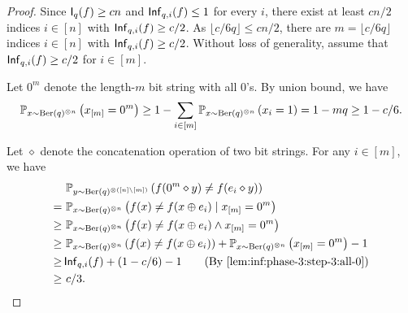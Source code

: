 \begin{proof}
    Since $\operatorname{\mathsf{I}}_q(f) \ge cn$ and $\operatorname{\mathsf{Inf}}_{q,i}(f) \le 1$ for every $i$, there exist at least $cn/2$ indices $i\in [n]$ with $\operatorname{\mathsf{Inf}}_{q,i}(f) \ge c / 2$. As $\lfloor c / 6q\rfloor \le cn/2$, there are $m = \lfloor c / 6q\rfloor$ indices $i\in [n]$ with $\operatorname{\mathsf{Inf}}_{q,i}(f) \ge c / 2$. Without loss of generality, assume that $\operatorname{\mathsf{Inf}}_{q,i}(f) \ge c / 2$ for $i\in [m]$.

    Let $0^m$ denote the length-$m$ bit string with all $0$'s. By union bound, we have
    \begin{align}
    \label{lem:inf:phase-3:step-3:all-0}
    \begin{split}
    \mathbb{P}_{x \sim \operatorname{\mathrm{Ber}}(q)^{\otimes n}}\left(x_{[m]}=0^m\right) \ge 1 - \sum_{i\in [m]} \mathbb{P}_{x \sim \operatorname{\mathrm{Ber}}(q)^{\otimes n}}\left(x_i = 1\right) = 1 - mq \ge 1 - c / 6.
    \end{split}
    \end{align}

    Let $\diamond$ denote the concatenation operation of two bit strings. For any $i \in [m]$, we have
    \begin{align}
    \nonumber &~\bP_{y \sim \Ber(q)^{\otimes ([n]\backslash [m])}}\left(f(0^{m} \diamond y) \ne f(e_i \diamond y)\right) \\
    \nonumber =&~\bP_{x \sim \Ber(q)^{\otimes n}}\left(f(x) \ne f(x \oplus e_i) \mid x_{[m]}=0^m\right)\\
    \nonumber \ge&~\bP_{x \sim \Ber(q)^{\otimes n}}\left(f(x) \ne f(x \oplus e_i) \wedge x_{[m]}=0^m\right)\\
    \nonumber \ge &~\bP_{x \sim \Ber(q)^{\otimes n}}\left(f(x) \ne f(x \oplus e_i)\right) + \bP_{x \sim \Ber(q)^{\otimes n}}\left(x_{[m]}=0^m\right) - 1 \\
    \nonumber \ge & \Inf_{q, i}(f) +(1 - c/6) - 1 \tag{By \cref{lem:inf:phase-3:step-3:all-0}}\\
    \ge &~c / 3. \label{eq:lem:inf:phase-3:step-3:eq2}
    \end{align}


\end{proof}
